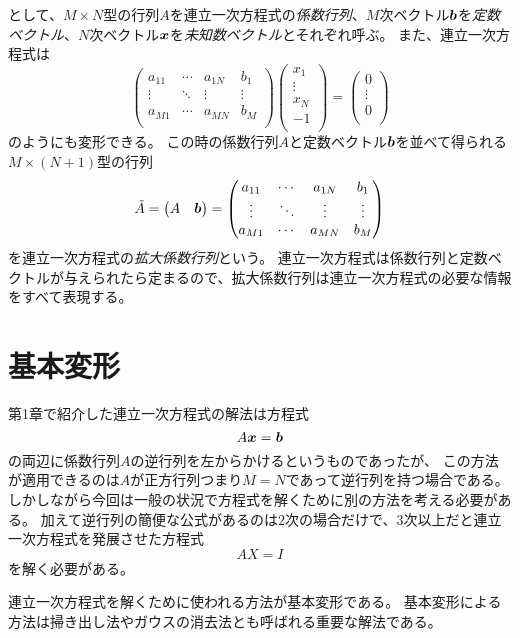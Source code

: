 として、$M\times N$型の行列$A$を連立一次方程式の\emph{係数行列}、$M$次ベクトル$\vb*{b}$を\emph{定数ベクトル}、$N$次ベクトル$\vb*{x}$を\emph{未知数ベクトル}とそれぞれ呼ぶ。
また、連立一次方程式は
$$
\begin{pmatrix}
a_{1 1} & \cdots & a_{1 N} & b_1 \\
\vdots & \ddots & \vdots & \vdots \\
a_{M 1} & \cdots & a_{M N} & b_M \\
\end{pmatrix}
\begin{pmatrix}
x_1 \\
\vdots \\
x_N \\
-1 \\
\end{pmatrix}
=
\begin{pmatrix}
0 \\
\vdots \\
0 \\
\end{pmatrix}
$$
のようにも変形できる。
この時の係数行列$A$と定数ベクトル$\vb*{b}$を並べて得られる$M\times(N+1)$型の行列
$$
\tilde{A}
= \begin{pmatrix}A & \vb*{b}\end{pmatrix}
=
\begin{pmatrix}
a_{1 1} & \cdots & a_{1 N} & b_1 \\
\vdots & \ddots & \vdots & \vdots \\
a_{M 1} & \cdots & a_{M N} & b_M \\
\end{pmatrix}
$$
を連立一次方程式の\emph{拡大係数行列}という。
連立一次方程式は係数行列と定数ベクトルが与えられたら定まるので、拡大係数行列は連立一次方程式の必要な情報をすべて表現する。

\section{基本変形}

第1章で紹介した連立一次方程式の解法は方程式
$$
A\vb*{x} = \vb*{b}
$$
の両辺に係数行列$A$の逆行列を左からかけるというものであったが、
この方法が適用できるのは$A$が正方行列つまり$M = N$であって逆行列を持つ場合である。
しかしながら今回は一般の状況で方程式を解くために別の方法を考える必要がある。
加えて逆行列の簡便な公式があるのは$2$次の場合だけで、$3$次以上だと連立一次方程式を発展させた方程式
$$
A X = I
$$
を解く必要がある。

連立一次方程式を解くために使われる方法が基本変形である。
基本変形による方法は掃き出し法やガウスの消去法とも呼ばれる重要な解法である。

